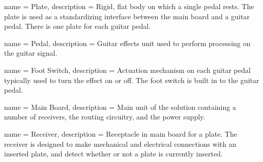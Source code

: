  {
	name = Plate,
	description = {Rigid, flat body on which a single pedal rests.  The plate is used as a standardizing interface between the main board and a guitar pedal.  There is one plate for each guitar pedal.}
}

 {
	name = Pedal,
	description = {Guitar effects unit used to perform processing on the guitar signal.}
}

 {
	name = {Foot Switch},
	description = {Actuation mechanism on each guitar pedal typically used to turn the effect on or off.  The foot switch is built in to the guitar pedal.}
}

 {
	name = {Main Board},
	description = {Main unit of the solution containing a number of receivers, the routing circuitry, and the power supply.}
}

 {
	name = {Receiver},
	description = {Receptacle in main board for a plate.  The receiver is designed to make mechanical and electrical connections with an inserted plate, and detect whether or not a plate is currently inserted.}
}